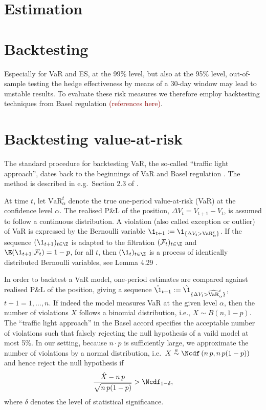 \documentclass[square]{article} %
\providecommand{\natp}[1]{\textcolor{darkred}{#1}}
\theoremstyle{plain}
\theoremstyle{definition} %
\begin{document}
\clearpage
\section{Estimation}


\clearpage

\section{Backtesting}
\label{sec:backtesting}

Especially for VaR and ES, at the 99\% level, but also at the 95\%
level, out-of-sample testing the hedge effectiveness by means of a
30-day window may lead to unstable results. To evaluate these risk
measures we therefore employ backtesting techniques from Basel
regulation \natp{(references here)}.

\section{Backtesting value-at-risk}
\label{sec:backtesting-value-at}

The standard procedure for backtesting VaR, the so-called ``traffic
light approach'', dates back to the beginnings of VaR and Basel
regulation \cite{Basel1996b}. The method is described in e.g.\ Section
2.3 of \cite{McNeil2005}.

At time $t$, let $\text{VaR}_\alpha^t$ denote the true one-period 
value-at-risk (VaR) at the confidence level $\alpha$. The realised
P\&L of the position, $\Delta V_t=V_{t+1}-V_t$, is assumed to follow a
continuous distribution. %
A violation (also called exception or outlier) of VaR is expressed by
the Bernoulli variable 
$\1_{t+1}:=\1_{\{\Delta V_t>\text{VaR}_\alpha^t\}}$.
If the sequence $(\1_{t+1})_{t\in \Z}$ is adapted 
to the filtration $(\mathcal F_t)_{t\in \Z}$ and $\E(\1_{t+1}|\mathcal
F_t)=1-p$, for all $t$, then $(\1_t)_{t\in \Z}$ is a process of 
identically distributed Bernoulli variables, see 
Lemma 4.29 \cite{McNeil2005}.


In order to backtest a VaR model, 
one-period estimates are 
compared against realised P\&L of the
position, giving a sequence $\hat\1_{t+1}:=\hat\1_{\{\Delta V_t >
  \widehat{\text{VaR}}_\alpha^t\}}$, $t+1=1, \ldots, n$. If indeed the
model measures VaR at the given level $\alpha$, then the number of
violations $X$ follows a binomial distribution, i.e., $X\sim
B(n,1-p)$. The ``traffic light approach'' in the Basel accord
specifies the acceptable number of violations such that falsely
rejecting the null hypothesis of a vaild model at most 5\%. In
our setting, because $n\cdot p$ is sufficiently large, we approximate
the number of violations by a normal distribution, i.e.\
$X\stackrel{a}{\sim} \displaystyle \Ncdf\left(n\, p, 
  n\, p(1-p)\right)$ and hence reject the null hypothesis if
\begin{equation*}
  \frac{\hat X-n\, p}{\sqrt{n\, p(1-p)}} > \Ncdf_{1-\delta},
\end{equation*}
where $\delta$ denotes the level of statistical significance. 
\end{document}
